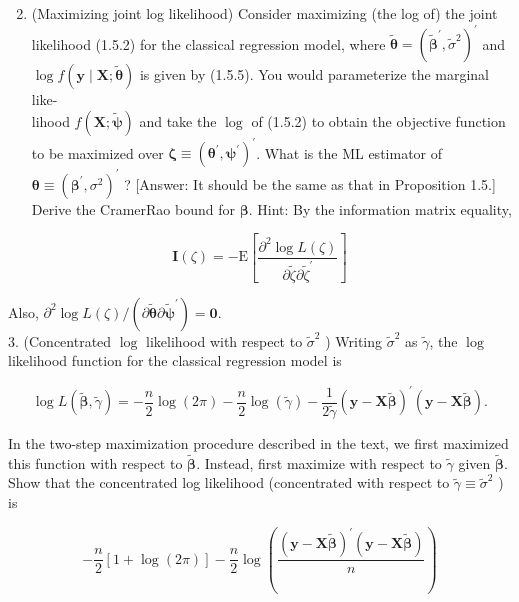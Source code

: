 \documentclass[10pt]{article}
\begin{document}
\begin{enumerate}
  \setcounter{enumi}{1}
  \item (Maximizing joint log likelihood) Consider maximizing (the log of) the joint likelihood (1.5.2) for the classical regression model, where $\tilde{\boldsymbol{\theta}}=\left(\tilde{\boldsymbol{\beta}}^{\prime}, \tilde{\sigma}^{2}\right)^{\prime}$ and $\log f(\mathbf{y} \mid \mathbf{X} ; \tilde{\boldsymbol{\theta}})$ is given by (1.5.5). You would parameterize the marginal like-\\
lihood $f(\mathbf{X} ; \tilde{\boldsymbol{\psi}})$ and take the $\log$ of (1.5.2) to obtain the objective function to be maximized over $\boldsymbol{\zeta} \equiv\left(\boldsymbol{\theta}^{\prime}, \boldsymbol{\psi}^{\prime}\right)^{\prime}$. What is the ML estimator of $\boldsymbol{\theta} \equiv\left(\boldsymbol{\beta}^{\prime}, \sigma^{2}\right)^{\prime}$ ? [Answer: It should be the same as that in Proposition 1.5.] Derive the CramerRao bound for $\boldsymbol{\beta}$. Hint: By the information matrix equality,
\end{enumerate}

$$
\mathbf{I}(\zeta)=-\mathrm{E}\left[\frac{\partial^{2} \log L(\zeta)}{\partial \tilde{\zeta} \partial \tilde{\zeta}^{\prime}}\right]
$$

Also, $\partial^{2} \log L(\zeta) /\left(\partial \tilde{\boldsymbol{\theta}} \partial \tilde{\boldsymbol{\psi}}^{\prime}\right)=\mathbf{0}$.\\
3. (Concentrated $\log$ likelihood with respect to $\tilde{\sigma}^{2}$ ) Writing $\tilde{\sigma}^{2}$ as $\tilde{\gamma}$, the $\log$ likelihood function for the classical regression model is

$$
\log L(\tilde{\boldsymbol{\beta}}, \tilde{\gamma})=-\frac{n}{2} \log (2 \pi)-\frac{n}{2} \log (\tilde{\gamma})-\frac{1}{2 \tilde{\gamma}}(\mathbf{y}-\mathbf{X} \tilde{\boldsymbol{\beta}})^{\prime}(\mathbf{y}-\mathbf{X} \tilde{\boldsymbol{\beta}}) .
$$

In the two-step maximization procedure described in the text, we first maximized this function with respect to $\widetilde{\boldsymbol{\beta}}$. Instead, first maximize with respect to $\tilde{\gamma}$ given $\widetilde{\boldsymbol{\beta}}$. Show that the concentrated log likelihood (concentrated with respect to $\tilde{\gamma} \equiv \tilde{\sigma}^{2}$ ) is

$$
-\frac{n}{2}[1+\log (2 \pi)]-\frac{n}{2} \log \left(\frac{(\mathbf{y}-\mathbf{X} \tilde{\boldsymbol{\beta}})^{\prime}(\mathbf{y}-\mathbf{X} \tilde{\boldsymbol{\beta}})}{n}\right)
$$
\end{document}
